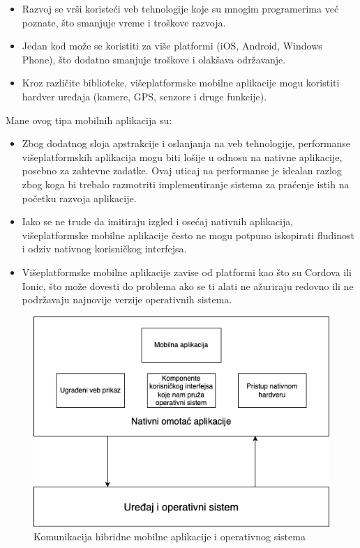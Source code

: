 \documentclass[12pt,oneside]{memoir}
\begin{document}
\begin{itemize}
    \item Razvoj se vrši koristeći veb tehnologije koje su mnogim programerima već poznate, što smanjuje vreme i troškove razvoja.
    \item Jedan kod može se koristiti za više platformi (iOS, Android, Windows Phone), što dodatno smanjuje troškove i olakšava održavanje.
    \item Kroz različite biblioteke, višeplatformske mobilne aplikacije mogu koristiti hardver uređaja (kamere, GPS, senzore i druge funkcije).
\end{itemize}
Mane ovog tipa mobilnih aplikacija su:
\begin{itemize}
    \item Zbog dodatnog sloja apstrakcije i oslanjanja na veb tehnologije, performanse višeplatformskih aplikacija mogu biti lošije u odnosu na nativne aplikacije, posebno za zahtevne zadatke. Ovaj uticaj na performanse je idealan razlog zbog koga bi trebalo razmotriti implementiranje sistema za praćenje istih na početku razvoja aplikacije.
    \item Iako se ne trude da imitiraju izgled i osećaj nativnih aplikacija, višeplatformske mobilne aplikacije često ne mogu potpuno iskopirati fludinost i odziv nativnog korisničkog interfejsa.
    \item Višeplatformske mobilne aplikacije zavise od platformi kao što su Cordova ili Ionic, što može dovesti do problema ako se ti alati ne ažuriraju redovno ili ne podržavaju najnovije verzije operativnih sistema.
\end{itemize}

\begin{figure}[h]
    \centering
    \includegraphics[scale=0.5]{docs/images/chapterTwo/hibridnaMobilnaAplikacija.png}
    \caption{Komunikacija hibridne mobilne aplikacije i operativnog sistema}
    \label{fig:hibridnaMobilnaAplikacija}
\end{figure}
\end{document}
